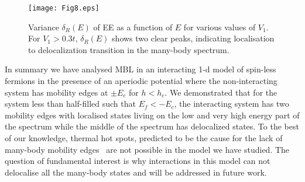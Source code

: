 \documentclass[prl,aps,twocolumn,floats,nofootinbib,showpacs]{revtex4}
\begin{document}
\begin{figure}[h!]
\begin{center}
\vskip-0.6cm
\texttt{[image: Fig8.eps]}
\vskip-0.7cm
\caption{Variance $\delta_R(E)$ of EE as a function of $E$ for various values of $V_1$. For $V_1 > 0.3t$, $\delta_R(E)$ shows two clear peaks, indicating localisation to delocalization transition in the many-body spectrum.}
\label{var}
\end{center}
\vskip-0.5cm
\end{figure}
In summary we have analysed MBL in an interacting 1-d model of spin-less fermions in the presence of an aperiodic potential where the non-interacting system has mobility edges at $\pm E_c$ for $h <h_c$. We demonstrated that for the system less than half-filled such that $E_f<-E_c$, the interacting system has two mobility edges with localised states living on the low and very high energy part of the spectrum while the middle of the spectrum has delocalized states. To the best of our knowledge, thermal hot spots, predicted to be the cause for the lack of many-body mobility edges~\cite{Mueller_hs} are not possible in the model we have studied. The question of fundamental interest is why interactions in this model can not delocalise all the many-body states and will be addressed in future work.
\end{document}
